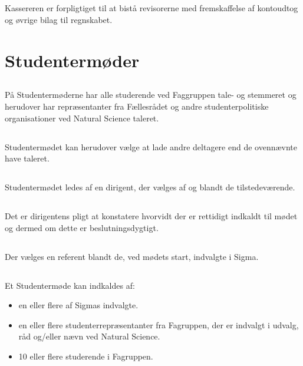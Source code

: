 \documentclass[danish,a4paper,twocolumn]{article}
\begin{document}
\subsection{}Kassereren er forpligtiget til at bistå revisorerne med
fremskaffelse af kontoudtog og øvrige bilag til regnskabet.

\section{Studentermøder}\label{par:studmdr}
\subsection{}På Studentermøderne har alle studerende ved Faggruppen
tale- og stemmeret og herudover har repræsentanter fra Fællesrådet og
andre studenterpolitiske organisationer ved Natural Science taleret.

\subsection{}Studentermødet kan herudover vælge at lade andre deltagere end de ovennævnte have taleret.
\subsection{}Studentermødet ledes af en dirigent, der vælges af og blandt de tilstedeværende.
\subsection{}Det er dirigentens pligt at konstatere hvorvidt der er rettidigt indkaldt til mødet og dermed om dette er beslutningsdygtigt.
\subsection{}Der vælges en referent blandt de, ved mødets start, indvalgte i Sigma.
\subsection{}Et Studentermøde kan indkaldes af:
\begin{itemize}
        \item en eller flere af Sigmas indvalgte.
        \item en eller flere studenterrepræsentanter fra Fagruppen, der er
            indvalgt i udvalg, råd og/eller nævn ved Natural Science.
        \item 10 eller flere studerende i Fagruppen.
\end{itemize}
\end{document}
